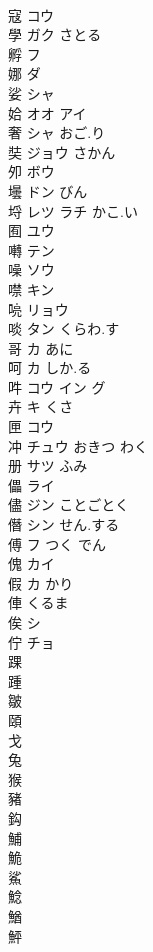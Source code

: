 \documentclass[8pt]{extreport}
\begin{document}
\begin{CJK}{UTF8}{min}
\\	寇	コウ					
\\	學	ガク さとる					
\\	孵	フ			
\\	娜	ダ			
\\	娑	シャ			
\\	姶	オオ アイ			
\\	奢	シャ おご.り			
\\	奘	ジョウ さかん			
\\	夘	ボウ			
\\	壜	ドン びん			
\\	埒	レツ ラチ かこ.い			
\\	囿	ユウ			
\\	囀	テン			
\\	噪	ソウ			
\\	噤	キン			
\\	喨	リョウ			
\\	啖	タン くらわ.す			
\\	哥	カ あに			
\\	呵	カ しか.る			
\\	吽	コウ イン グ			
\\	卉	キ くさ			
\\	匣	コウ			
\\	冲	チュウ おきつ わく			
\\	册	サツ ふみ			
\\	儡	ライ			
\\	儘	ジン ことごとく			
\\	僭	シン せん.する			
\\	傅	フ つく でん			
\\	傀	カイ			
\\	假	カ かり			
\\	俥	くるま			
\\	俟	シ			
\\	佇	チョ			
\\	踝										
\\	踵										
\\	皺										
\\	頤										
\\	戈										
\\	兔										
\\	猴										
\\	豬										
\\	鈎										
\\	鯆										
\\	鮠										
\\	鯊										
\\	鯰										
\\	鰌										
\\	鮃										
\end{CJK}
\end{document}
